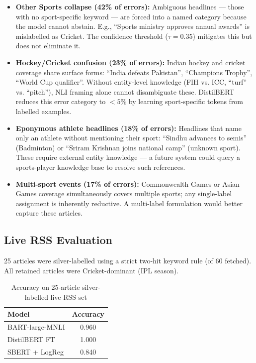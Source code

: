 \documentclass[11pt,a4paper]{article}
\begin{document}
\begin{itemize}[noitemsep]
  \item \textbf{Other Sports collapse (42\% of errors):} Ambiguous headlines — those with no sport-specific keyword — are forced into a named category because the model cannot abstain. E.g., ``Sports ministry approves annual awards'' is mislabelled as Cricket. The confidence threshold ($\tau=0.35$) mitigates this but does not eliminate it.
  \item \textbf{Hockey/Cricket confusion (23\% of errors):} Indian hockey and cricket coverage share surface forms: ``India defeats Pakistan'', ``Champions Trophy'', ``World Cup qualifier''. Without entity-level knowledge (FIH vs. ICC, ``turf'' vs. ``pitch''), NLI framing alone cannot disambiguate these. DistilBERT reduces this error category to $<5\%$ by learning sport-specific tokens from labelled examples.
  \item \textbf{Eponymous athlete headlines (18\% of errors):} Headlines that name only an athlete without mentioning their sport: ``Sindhu advances to semis'' (Badminton) or ``Sriram Krishnan joins national camp'' (unknown sport). These require external entity knowledge — a future system could query a sports-player knowledge base to resolve such references.
  \item \textbf{Multi-sport events (17\% of errors):} Commonwealth Games or Asian Games coverage simultaneously covers multiple sports; any single-label assignment is inherently reductive. A multi-label formulation would better capture these articles.
\end{itemize}

\subsection{Live RSS Evaluation}

25 articles were silver-labelled using a strict two-hit keyword rule (of 60 fetched). All retained articles were Cricket-dominant (IPL season).

\begin{table}[H]\centering
\caption{Accuracy on 25-article silver-labelled live RSS set}
\begin{tabular}{lc}
\toprule
\textbf{Model} & \textbf{Accuracy}\\
\midrule
BART-large-MNLI  & 0.960\\
DistilBERT FT    & 1.000\\
SBERT + LogReg   & 0.840\\
\bottomrule
\end{tabular}
\end{table}
\end{document}
